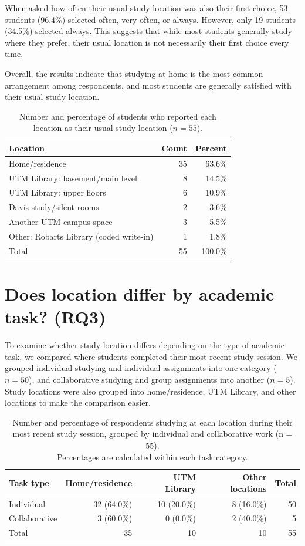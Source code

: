 \documentclass[11pt,letterpaper]{article}
\begin{document}
When asked how often their usual study location was also their first choice, 53 students (96.4\%) selected often, very often, or always. However, only 19 students (34.5\%) selected always. This suggests that while most students generally study where they prefer, their usual location is not necessarily their first choice every time.

Overall, the results indicate that studying at home is the most common arrangement among respondents, and most students are generally satisfied with their usual study location.

\begin{table}[H]\centering\small
\label{tab:usual}
\begin{tabular}{@{}p{9cm}rr@{}}\toprule
Location & Count & Percent\\\midrule
Home/residence & 35 & 63.6\%\\
UTM Library: basement/main level & 8 & 14.5\%\\
UTM Library: upper floors & 6 & 10.9\%\\
Davis study/silent rooms & 2 & 3.6\%\\
Another UTM campus space & 3 & 5.5\%\\
Other: Robarts Library (coded write-in) & 1 & 1.8\%\\\midrule
Total & 55 & 100.0\%\\\bottomrule
\end{tabular}
\caption{Number and percentage of students who reported each location as their usual study location ($n = 55$).}
\end{table}

\section{Does location differ by academic task? (RQ3)}
To examine whether study location differs depending on the type of academic task, we compared where students completed their most recent study session. We grouped individual studying and individual assignments into one category ($n = 50$), and collaborative studying and group assignments into another ($n = 5$). Study locations were also grouped into home/residence, UTM Library, and other locations to make the comparison easier.

\begin{table}[H]\centering\small
\label{tab:cross}
\begin{tabular}{@{}lrrrr@{}}\toprule
Task type & Home/residence & UTM Library & Other locations & Total\\\midrule
Individual & 32 (64.0\%) & 10 (20.0\%) & 8 (16.0\%) & 50\\
Collaborative & 3 (60.0\%) & 0 (0.0\%) & 2 (40.0\%) & 5\\\midrule
Total & 35 & 10 & 10 & 55\\\bottomrule\end{tabular}
\caption{Number and percentage of respondents studying at each location during their \\most recent study session, grouped by individual and collaborative work (n = 55).\\ Percentages are calculated within each task category.}
\end{table}
\end{document}
